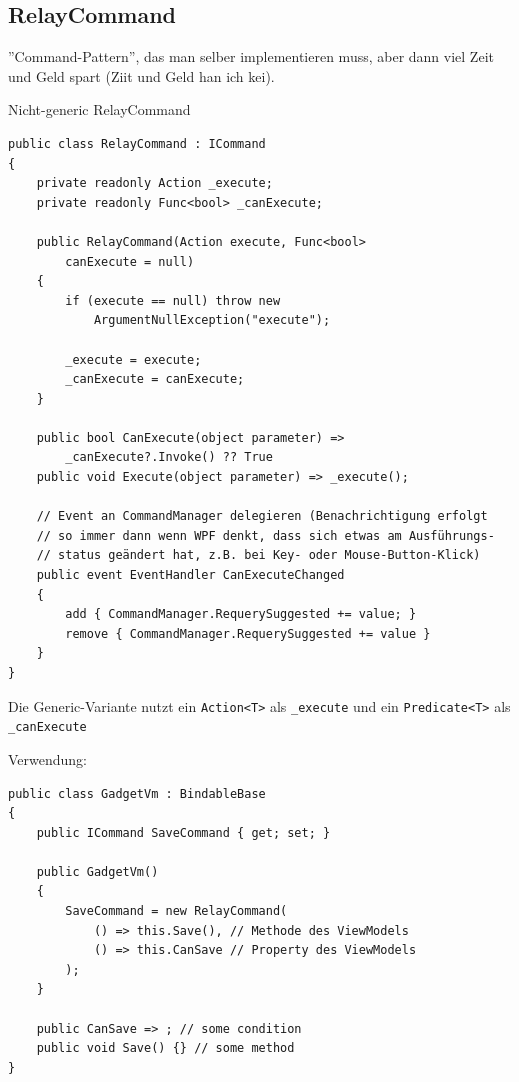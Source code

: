 \subsection{RelayCommand}
''Command-Pattern'', das man selber implementieren muss, aber dann viel Zeit und Geld spart (Ziit und Geld han ich kei).

Nicht-generic RelayCommand
\begin{lstlisting}
public class RelayCommand : ICommand
{
    private readonly Action _execute;
    private readonly Func<bool> _canExecute;
    
    public RelayCommand(Action execute, Func<bool> 
        canExecute = null)
    {
        if (execute == null) throw new 
            ArgumentNullException("execute");
        
        _execute = execute;
        _canExecute = canExecute;
    }
    
    public bool CanExecute(object parameter) => 
        _canExecute?.Invoke() ?? True
    public void Execute(object parameter) => _execute();
    
    // Event an CommandManager delegieren (Benachrichtigung erfolgt
    // so immer dann wenn WPF denkt, dass sich etwas am Ausführungs- 
    // status geändert hat, z.B. bei Key- oder Mouse-Button-Klick)
    public event EventHandler CanExecuteChanged
    {
        add { CommandManager.RequerySuggested += value; }
        remove { CommandManager.RequerySuggested += value }
    }
}
\end{lstlisting}

Die Generic-Variante nutzt ein \texttt{Action<T>} als \texttt{_execute} und ein \texttt{Predicate<T>} als \texttt{_canExecute}

Verwendung:

\begin{lstlisting}
public class GadgetVm : BindableBase
{
    public ICommand SaveCommand { get; set; }
    
    public GadgetVm()
    {
        SaveCommand = new RelayCommand(
            () => this.Save(), // Methode des ViewModels
            () => this.CanSave // Property des ViewModels
        );
    }
    
    public CanSave => ; // some condition
    public void Save() {} // some method
}
\end{lstlisting}

